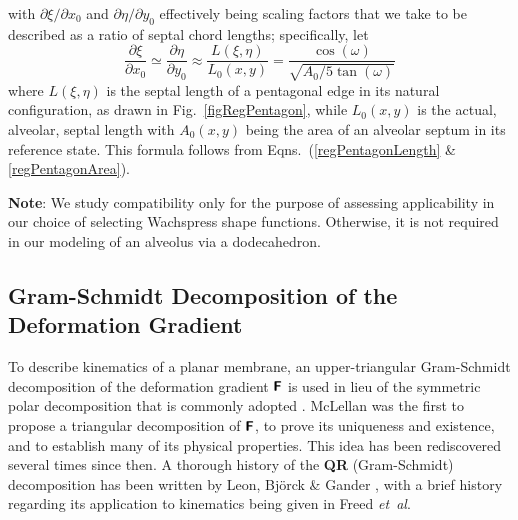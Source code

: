 with $\partial \xi / \partial x_0$ and $\partial \eta / \partial y_0$ effectively being scaling factors that we take to be described as a ratio of septal chord lengths; specifically, let
\begin{equation}
\frac{\partial \xi}{\partial x_0} \simeq
\frac{\partial \eta}{\partial y_0} \approx 
\frac{L(\xi, \eta)}{L_0 (x, y)} = 
\frac{\cos (\omega)}{\sqrt{A_0 / 5 \tan (\omega)}}
\end{equation}
where $L(\xi,\eta)$ is the septal length of a pentagonal edge in its natural configuration, as drawn in Fig.~\ref{figRegPentagon}, while $L_0(x,y)$ is the actual, alveolar, septal length with $A_0(x,y)$ being the area of an alveolar septum in its reference state.  This formula follows from Eqns.~(\ref{regPentagonLength} \& \ref{regPentagonArea}).

\textbf{Note}: We study compatibility only for the purpose of assessing applicability in our choice of selecting Wachspress shape functions.  Otherwise, it is not required in our modeling of an alveolus via a dodecahedron. 

\subsection{Gram-Schmidt Decomposition of the Deformation Gradient}
\label{secQR}

To describe kinematics of a planar membrane, an upper-triangular Gram-Schmidt decomposition of the deformation gradient $\boldsymbol{\mathsf{F}}$ is used in lieu of the symmetric polar decomposition that is commonly adopted \cite{Srinivasa12,FreedSrinivasa15,Freedetal17,FreedZamani19,Freedetal19}.  McLellan \cite{McLellan76,McLellan80} was the first to propose a triangular decomposition of $\boldsymbol{\mathsf{F}}$, to prove its uniqueness and existence, and to establish many of its physical properties.  This idea has been rediscovered several times since then. \cite{Rosakis90,Souchet93,Srinivasa12}  A thorough history of the \textbf{QR} (Gram-Schmidt) decomposition has been written by Leon, Bj\"orck \& Gander \cite{Leonetal13}, with a brief history regarding its application to kinematics being given in Freed \textit{et~al}. \cite{Freedetal19}

